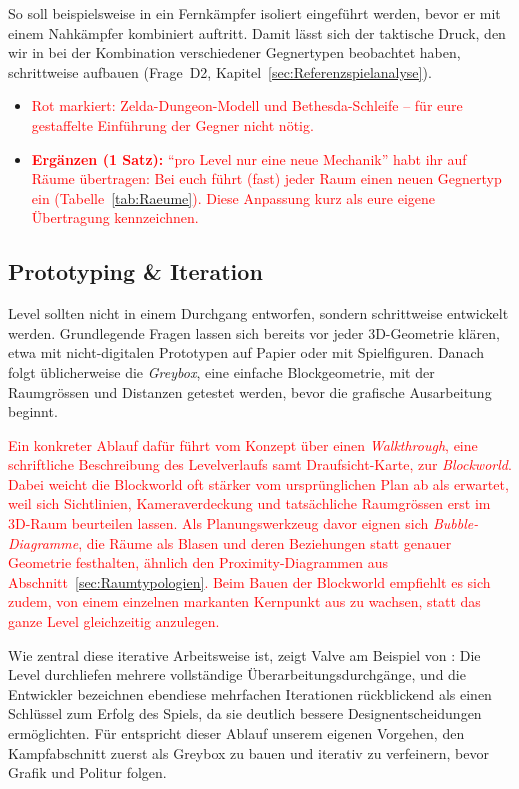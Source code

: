 \documentclass[../Main.tex]{subfiles}
\begin{document}
So soll beispielsweise in  ein Fernkämpfer isoliert eingeführt werden, bevor er mit einem Nahkämpfer kombiniert auftritt. Damit lässt sich der taktische Druck, den wir in  bei der Kombination verschiedener Gegnertypen beobachtet haben, schrittweise aufbauen (Frage~D2, Kapitel~\ref{sec:Referenzspielanalyse}).

\begin{itemize}[leftmargin=1.5cm]
    \item \textcolor{red}{Rot markiert: Zelda-Dungeon-Modell und Bethesda-Schleife -- für eure gestaffelte Einführung der Gegner nicht nötig.}
    \item \textcolor{red}{\textbf{Ergänzen (1 Satz):} \enquote{pro Level nur eine neue Mechanik} habt ihr auf Räume übertragen: Bei euch führt (fast) jeder Raum einen neuen Gegnertyp ein (Tabelle~\ref{tab:Raeume}). Diese Anpassung kurz als eure eigene Übertragung kennzeichnen.}
\end{itemize}

\subsection{Prototyping \& Iteration} \label{sec:Prototyping}
Level sollten nicht in einem Durchgang entworfen, sondern schrittweise entwickelt werden. Grundlegende Fragen lassen sich bereits vor jeder 3D-Geometrie klären, etwa mit nicht-digitalen Prototypen auf Papier oder mit Spielfiguren. Danach folgt üblicherweise die \textit{Greybox}, eine einfache Blockgeometrie, mit der Raumgrössen und Distanzen getestet werden, bevor die grafische Ausarbeitung beginnt.\autocite{totten2014architectural}

\textcolor{red}{Ein konkreter Ablauf dafür führt vom Konzept über einen \textit{Walkthrough}, eine schriftliche Beschreibung des Levelverlaufs samt Draufsicht-Karte, zur \textit{Blockworld}. Dabei weicht die Blockworld oft stärker vom ursprünglichen Plan ab als erwartet, weil sich Sichtlinien, Kameraverdeckung und tatsächliche Raumgrössen erst im 3D-Raum beurteilen lassen. Als Planungswerkzeug davor eignen sich \textit{Bubble-Diagramme}, die Räume als Blasen und deren Beziehungen statt genauer Geometrie festhalten, ähnlich den Proximity-Diagrammen aus Abschnitt~\ref{sec:Raumtypologien}. Beim Bauen der Blockworld empfiehlt es sich zudem, von einem einzelnen markanten Kernpunkt aus zu wachsen, statt das ganze Level gleichzeitig anzulegen.\autocite{gdc_leveldesignaday2020}}

Wie zentral diese iterative Arbeitsweise ist, zeigt Valve am Beispiel von : Die Level durchliefen mehrere vollständige Überarbeitungsdurchgänge, und die Entwickler bezeichnen ebendiese mehrfachen Iterationen rückblickend als einen Schlüssel zum Erfolg des Spiels, da sie deutlich bessere Designentscheidungen ermöglichten.\autocite{jacobson2005postmortem} Für  entspricht dieser Ablauf unserem eigenen Vorgehen, den Kampfabschnitt zuerst als Greybox zu bauen und iterativ zu verfeinern, bevor Grafik und Politur folgen.
\end{document}

